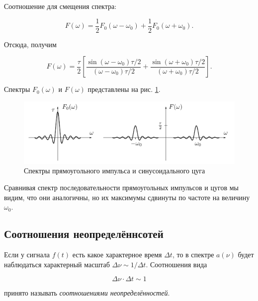 \documentclass[a4paper, 12pt]{article}
\begin{document}
    Соотношение для смещения спектра:

    \begin{equation}
        F(\omega) = \frac{1}{2} F_0(\omega - \omega_0) + \frac{1}{2} F_0(\omega + \omega_0).
    \end{equation}

    Отсюда, получим

    \begin{equation}
        F(\omega) = \frac{\tau}{2} \left[\frac{\sin{(\omega - \omega_0) \tau/2}}{(\omega - \omega_0) \tau/2} + \frac{\sin{(\omega + \omega_0) \tau/2}}{(\omega + \omega_0) \tau/2}\right].
    \end{equation}

    Спектры $F_0(\omega)$ и $F(\omega)$ представлены на рис. \ref{spectrum_zug}.

    \begin{figure}[H]
        \centering
        \includegraphics[width = 14 cm]{images/zug_F(omega).png}
        \caption{Спектры прямоугольного импульса и синусоидального цуга}
        \label{spectrum_zug}
    \end{figure}

    Сравнивая спектр последовательности прямоугольных импульсов и цугов мы видим, что они аналогичны, но их максимумы сдвинуты по частоте на величину $\omega_{0}$.

    \subsection{Соотношения неопределённсотей}

    \label{theor_uncertainty}

    Если у сигнала $f(t)$ есть какое характерное время $\Delta t$, то в спектре $a(\nu)$ будет наблюдаться характерный масштаб $\Delta \nu \sim 1/\Delta t$. Соотношения вида

    \begin{equation}
        \Delta \nu \cdot \Delta t \sim 1
    \end{equation}

    принято называть \textit{соотношениями неопределённостей}.
\end{document}
